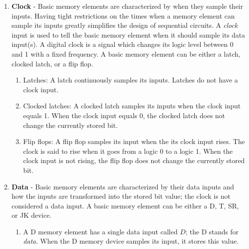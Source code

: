 \begin{enumerate}
\item \textbf{ Clock} - Basic memory elements are characterized by 
when they sample their inputs.  Having tight restrictions on the
times when a memory element can sample its inputs greatly 
simplifies the design of sequential circuits.  A \textit{ clock}
input is used to tell the basic memory element when it should sample 
its data input(s).  A digital clock is a signal which 
changes its logic level between 0 and 1 with a fixed frequency.
A basic memory element can be either a latch, clocked latch, or
a flip flop.

\begin{enumerate}

\item Latches: A latch continuously samples its inputs.  
Latches do not have a clock input.

\item Clocked latches: A clocked latch samples its inputs when 
the clock input equals 1.  When the clock input equals 0, the 
clocked latch does not change the currently stored bit.

\item Flip flops: A flip flop samples its input when the its 
clock input rises.  The clock is said to rise when it goes 
from a logic 0 to a logic 1.  When the clock input is not rising, 
the flip flop does not change the currently stored bit.
\end{enumerate}


\item \textbf{ Data} - Basic memory elements are characterized by 
their data inputs and how the inputs are transformed into the 
stored bit value; the clock is not considered a data input.
A basic memory element can be either a D, T, SR, or JK device.

\begin{enumerate}

\item 
{}
A D memory element has a single data input called $D$;
the D stands for \textit{ data}.  When the
D memory device samples its input, it stores this value.  


\end{enumerate}
\end{enumerate}
